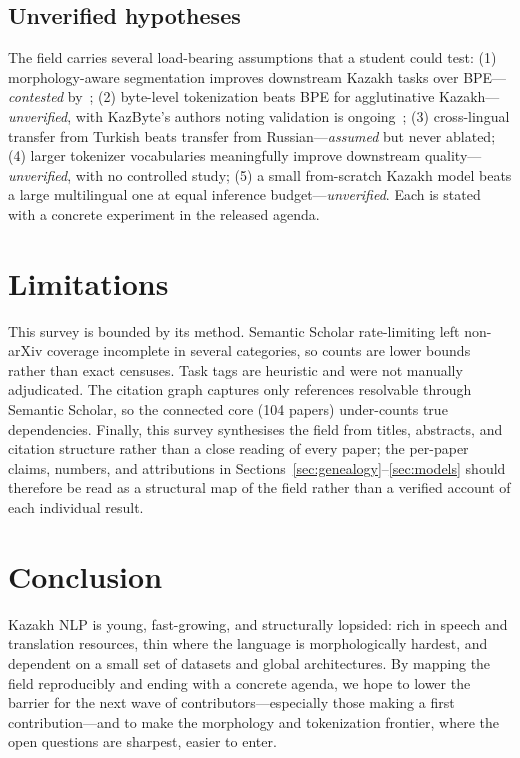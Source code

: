 \documentclass{article}
\begin{document}
\subsection{Unverified hypotheses}
The field carries several load-bearing assumptions that a student could test:
(1) morphology-aware segmentation improves downstream Kazakh tasks over BPE---\emph{contested}
by~\cite{saleva}; (2) byte-level tokenization beats BPE for agglutinative
Kazakh---\emph{unverified}, with KazByte's authors noting validation is ongoing~\cite{kazbyte};
(3) cross-lingual transfer from Turkish beats transfer from Russian---\emph{assumed} but
never ablated; (4) larger tokenizer vocabularies meaningfully improve downstream
quality---\emph{unverified}, with no controlled study; (5) a small from-scratch Kazakh model
beats a large multilingual one at equal inference budget---\emph{unverified}. Each is stated
with a concrete experiment in the released agenda.

\section{Limitations}
\label{sec:limits}
This survey is bounded by its method. Semantic Scholar rate-limiting left non-arXiv
coverage incomplete in several categories, so counts are lower bounds rather than exact
censuses. Task tags are heuristic and were not manually adjudicated. The citation graph
captures only references resolvable through Semantic Scholar, so the connected core (104
papers) under-counts true dependencies. Finally, this survey synthesises the field from
titles, abstracts, and citation structure rather than a close reading of every paper; the
per-paper claims, numbers, and attributions in
Sections~\ref{sec:genealogy}--\ref{sec:models} should therefore be read as a structural map
of the field rather than a verified account of each individual result.

\section{Conclusion}
Kazakh NLP is young, fast-growing, and structurally lopsided: rich in speech and
translation resources, thin where the language is morphologically hardest, and dependent
on a small set of datasets and global architectures. By mapping the field reproducibly and
ending with a concrete agenda, we hope to lower the barrier for the next wave of
contributors---especially those making a first contribution---and to make the morphology
and tokenization frontier, where the open questions are sharpest, easier to enter.
\end{document}
